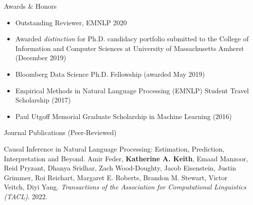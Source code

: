 \documentclass{resume} %
\begin{document}
\begin{rSection}{Awards \& Honors}
\begin{itemize}
\item Outstanding Reviewer, EMNLP 2020
\item Awarded \emph{distinction} for Ph.D. candidacy portfolio submitted to the College of Information and Computer Sciences at University of Massachusetts Amherst (December 2019) 
\item Bloomberg Data Science Ph.D. Fellowship (awarded May 2019)  
\item Empirical Methods in Natural Language Processing (EMNLP) Student Travel Scholarship (2017)
\item Paul Utgoff Memorial Graduate Scholarship in Machine Learning (2016) 
\end{itemize} 
\end{rSection}


%
\begin{rSection}{Journal Publications (Peer-Reviewed)}
\begin{etaremune}

\item Causal Inference in Natural Language Processing: Estimation, Prediction, Interpretation and Beyond. Amir Feder, \textbf{Katherine A. Keith}, Emaad Manzoor, Reid Pryzant, Dhanya Sridhar, Zach Wood-Doughty, Jacob Eisenstein, Justin Grimmer, Roi Reichart, Margaret E. Roberts, Brandon M. Stewart, Victor Veitch, Diyi Yang. \emph{Transactions of the Association for Computational Linguistics (TACL)}. 2022. 

\end{etaremune}
\end{rSection}
\end{document}
